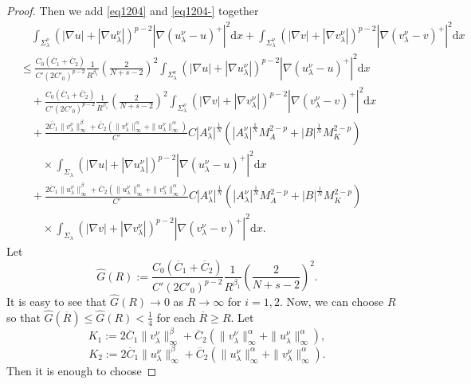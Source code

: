 \documentclass[12pt]{amsart}
\theoremstyle{definition}
\theoremstyle{remark}
\theoremstyle{conclusion}
\theoremstyle{conjecture}
\numberwithin{equation}{section}
\begin{document}
\begin{proof}
Then we add \eqref{eq1204} and \eqref{eq1204-} together
\begin{align}\label{sum}
& \quad\int_{\Sigma^{\nu}_\lambda} (|\nabla u|+|\nabla u^{\nu}_{\lambda}|)^{p-2} |\nabla(u^{\nu}_{\lambda}-u)^+|^2 \mathrm{d}x +\int_{\Sigma^{\nu}_\lambda} (|\nabla v|+|\nabla v^{\nu}_{\lambda}|)^{p-2} |\nabla(v^{\nu}_{\lambda}-v)^+|^2 \mathrm{d}x \\
&\leq \frac{C_0(\overline{C}_1+\overline{C}_2)}{C'(2C'_0)^{p-2}} \frac{1}{R^{\beta_1}}\left(\frac{2}{N+s-2}\right)^2 \int_{\Sigma_\lambda^\nu}(|\nabla u|+|\nabla u^{\nu}_{\lambda}|)^{p-2} |\nabla (u^{\nu}_{\lambda}-u)^+|^2 \mathrm{d}x \nonumber\\
& \quad +\frac{C_0(\overline{C}_1+\overline{C}_2)}{C'(2C'_0)^{p-2}}\frac{1}{R^{\beta_1}}\left(\frac{2}{N+s-2}\right)^2\int_{\Sigma_\lambda^\nu} (|\nabla v|+|\nabla v^{\nu}_{\lambda}|)^{p-2} |\nabla(v^{\nu}_{\lambda}-v )^+|^2 \mathrm{d}x  \nonumber\\
&\quad +\frac{2\overline{C}_1\|v^\nu_\lambda\|^\beta_\infty + \overline{C}_2(\|v^\nu_\lambda\|^\alpha_\infty+\|u^\nu_\lambda\|^\alpha_\infty) }{C'}C |A_\lambda^\nu|^\frac{1}{N} \left(  |A_\lambda^\nu|^\frac{1}{N} M_A^{2-p}+|B|^\frac{1}{N} M_K^{2-p} \right)  \nonumber\\
&\quad \quad \times \int_{\Sigma_\lambda} (|\nabla u|+|\nabla u^{\nu}_{\lambda}|)^{p-2} |\nabla(u^{\nu}_{\lambda}-u )^+|^2 \mathrm{d}x \nonumber\\
&\quad +\frac{2\overline{C}_1\|u^\nu_\lambda\|^\beta_\infty + \overline{C}_2(\|u^\nu_\lambda\|^\alpha_\infty+\|v^\nu_\lambda\|^\alpha_\infty )}{C'}C|A_\lambda^\nu|^\frac{1}{N} \left(  |A_\lambda^\nu|^\frac{1}{N} M_A^{2-p}+|B|^\frac{1}{N} M_K^{2-p} \right)  \nonumber\\
&\quad \quad\times \int_{\Sigma_\lambda} (|\nabla v|+|\nabla v^{\nu}_{\lambda}|)^{p-2} |\nabla(v^{\nu}_{\lambda}-v )^+|^2 \mathrm{d}x. \nonumber
\end{align}
Let
$$\hat{G}(R):=\frac{ C_0(\overline{C}_1+\overline{C}_2)}{C'(2C'_0)^{p-2}} \frac{1}{R^{\beta_1}}\left(\frac{2}{N+s-2}\right)^2.$$
It is easy to see that $\hat{G}(R)\to 0$ as $R\to\infty$ for $i=1,2.$
Now, we can choose $R$ so that $\hat{G}(\overline{R})\leq \hat{G}(R) <\frac{1}{4}$ for each $\overline{R}\geq R$. Let
$$K_1:=2\overline{C}_1\|v^\nu_\lambda\|^\beta_\infty + \overline{C}_2(\|v^\nu_\lambda\|^\alpha_\infty+\|u^\nu_\lambda\|^\alpha_\infty) ,$$
$$K_2:=2\overline{C}_1\|u^\nu_\lambda\|^\beta_\infty + \overline{C}_2(\|u^\nu_\lambda\|^\alpha_\infty+\|v^\nu_\lambda\|^\alpha_\infty ).$$
Then it is enough to choose

\end{proof}
\end{document}
